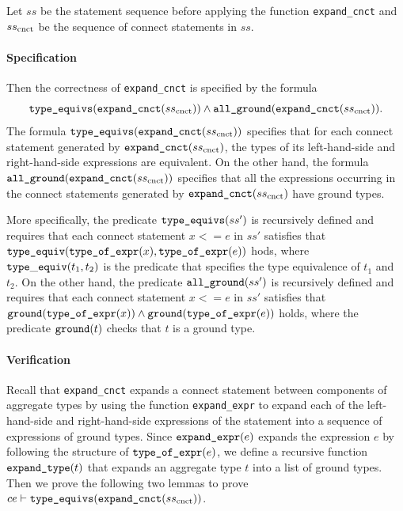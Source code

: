 
Let $ss$ be the statement sequence before applying the function {\tt expand\_cnct} and $ss_{\rm cnct}$ be the sequence of connect statements in $ss$. 

\paragraph*{Specification}
Then the correctness of {\tt expand\_cnct} is specified by the formula 
%
$$\mbox{\tt type\_equivs}(\mbox{\tt expand\_cnct}(ss_{\rm cnct})) \wedge \mbox{\tt all\_ground}(\mbox{\tt expand\_cnct}(ss_{\rm cnct})).$$ 
%
The formula $\mbox{\tt type\_equivs}(\mbox{\tt expand\_cnct}(ss_{\rm cnct}))$ specifies that for each connect statement generated by $\mbox{\tt expand\_cnct}(ss_{\rm cnct})$, the types of its left-hand-side and right-hand-side expressions are equivalent. On the other hand, the formula $\mbox{\tt all\_ground}(\mbox{\tt expand\_cnct}(ss_{\rm cnct}))$ specifies that all the expressions occurring in the connect statements generated by $\mbox{\tt expand\_cnct}(ss_{\rm cnct})$ have ground types. 

More specifically, 
the predicate $\mbox{\tt type\_equivs}(ss')$ is recursively defined and requires that each connect statement  $x <= e$ in  $ss'$ satisfies that $\mbox{\tt type\_equiv}(\mbox{\tt type\_of\_expr}(x), \mbox{\tt type\_of\_expr}(e))$ hods, where ${\tt type\_equiv}(t_1, t_2)$ is the predicate that specifies the type equivalence of $t_1$ and $t_2$. On the other hand, the predicate $\mbox{\tt all\_ground}(ss')$ is recursively defined and requires that each connect statement $x <= e$ in  $ss'$ satisfies that $\mbox{\tt ground}(\mbox{\tt type\_of\_expr}(x)) \wedge \mbox{\tt ground}(\mbox{\tt type\_of\_expr}(e))$ holds, where the predicate $\mbox{\tt ground}(t)$ checks that $t$ is a ground type.   

\paragraph*{Verification}
Recall that {\tt expand\_cnct} expands a connect statement between components of aggregate types by using the function {\tt expand\_expr} to expand each of the left-hand-side and right-hand-side expressions of the statement into a sequence of expressions of ground types. Since $\mbox{\tt expand\_expr}(e)$ expands the expression $e$ by following the structure of $\mbox{\tt type\_of\_expr}(e)$, we define a recursive function $\mbox{\tt expand\_type}(t)$ that expands an aggregate type $t$ into a list of ground types. Then we prove the following two lemmas to prove $ce \vdash \mbox{\tt type\_equivs}(\mbox{\tt expand\_cnct}(ss_{\rm cnct}))$.

